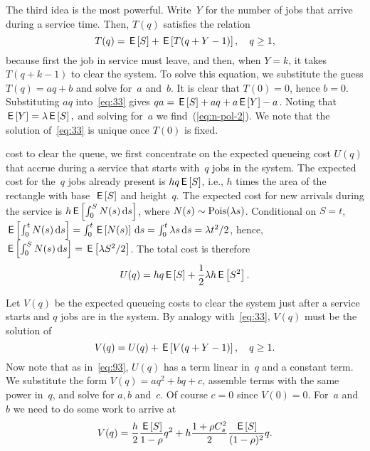 \documentclass[stochastic-or.tex]{subfiles}
\begin{document}
The third idea is the most powerful.
Write~$Y$ for the number of jobs that arrive during a service time.
Then, $T(q)$ satisfies the relation
\begin{equation}\label{eq:33}
  T(q) = \,\mathsf{E}\left[S\right] + \,\mathsf{E}\left[T(q+Y-1)\right],\quad q\geq 1,
\end{equation}
because first the job in service must leave, and then, when $Y=k$, it takes $T(q+k-1)$ to clear the system.
To solve this equation, we substitute the guess $T(q) = aq+b$ and solve for~$a$ and~$b$.
It is clear that $T(0)=0$, hence $b=0$.
Substituting $a q$ into~\cref{eq:33} gives $q a =\,\mathsf{E}\left[S\right] + aq + a\,\mathsf{E}\left[Y\right] - a$.
Noting that $\,\mathsf{E}\left[Y\right] = \lambda \,\mathsf{E}\left[S\right],$ and solving for~$a$ we find~(\cref{eq:n-pol-2}).
We note that the solution of~\cref{eq:33} is unique once $T(0)$ is fixed.




 cost to clear the queue, we first concentrate on the expected queueing cost $U(q)$ that accrue during a service that starts with~$q$ jobs in the system.
The expected cost for the~$q$ jobs already present is $h q \,\mathsf{E}\left[S\right]$, i.e., $h$ times the area of the rectangle with base~$\,\mathsf{E}\left[S\right]$ and height~$q$.
The expected cost for new arrivals during the service is $h \,\mathsf{E}\left[\int_0^{S} N(s) \,\textrm{d}s\right]$, where $N(s)\sim \mathrm{Pois}(\lambda s)$.
Conditional on $S=t$, $\,\mathsf{E}\left[\int_0^{t} N(s) \,\textrm{d}s \right] = \int_{0}^{t} \,\mathsf{E}\left[N(s)\right] \,\textrm{d}s = \int_{0}^{t} \lambda s \,\textrm{d}s = \lambda t^2/2$, hence, $\,\mathsf{E}\left[\int_0^{S} N(s) \,\textrm{d}s\right] = \,\mathsf{E}\left[\lambda S^{2}/2\right]$.
The total cost is therefore
\begin{equation*}
U(q)  =  h q \,\mathsf{E}\left[S\right] +  \frac 12 \lambda h \,\mathsf{E}\left[S^2\right].
\end{equation*}

Let $V(q)$ be the expected queueing costs to clear the system just after a service starts and  $q$ jobs are in the system.
By analogy with~\cref{eq:33}, $V(q)$ must be the solution of
\begin{equation}  \label{eq:98}
  V(q) = U(q) + \,\mathsf{E}\left[V(q+Y-1)\right], \quad q\geq 1.
\end{equation}
Now note that as in~\cref{eq:93}, $U(q)$ has a term linear in~$q$ and a constant term.
We substitute the form $V(q) = aq^2 + bq+c$, assemble terms with the same power in~$q$, and solve for $a, b$ and~$c$.
Of course $c = 0$ since $V(0)=0$.
For~$a$ and~$b$ we need to do some work to arrive at
\begin{align*}
  V(q) = \frac{h}{2}\frac{\,\mathsf{E}\left[S\right]}{1-\rho} q^2 + h  \frac{ 1+ \rho C_s^2}2 \frac{\,\mathsf{E}\left[S\right]}{(1-\rho)^2} q.
\end{align*}
\end{document}
